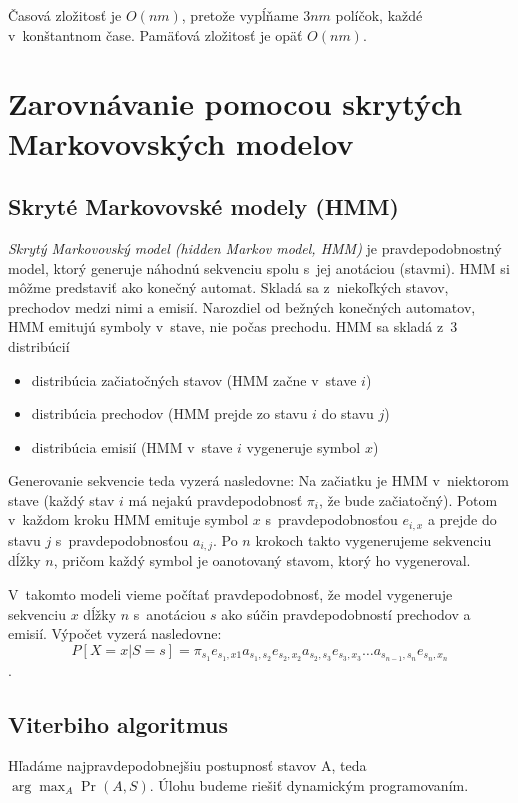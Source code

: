 Časová zložitosť je $O(nm)$, pretože vypĺňame $3nm$ políčok, každé v~konštantnom čase. Pamäťová zložitosť je opäť $O(nm)$.

\cite{durbin}

\section[Zarovnávanie s~HMM]{Zarovnávanie pomocou skrytých Markovovských modelov}
\label{sec:hmm-alignment}

\subsection{Skryté Markovovské modely (HMM)}
\textit{Skrytý Markovovský model (hidden Markov model, HMM)} je pravdepodobnostný model, ktorý generuje náhodnú sekvenciu spolu s~jej anotáciou (stavmi). HMM si môžme predstaviť ako konečný automat. Skladá sa z~niekoľkých stavov, prechodov medzi nimi a emisií. Narozdiel od bežných konečných automatov, HMM emitujú symboly v~stave, nie počas prechodu.
HMM sa skladá z~3 distribúcií
\begin{itemize}
\item distribúcia začiatočných stavov (HMM začne v~stave $i$)
\item distribúcia prechodov (HMM prejde zo stavu $i$ do stavu $j$)
\item distribúcia emisií (HMM v~stave $i$ vygeneruje symbol $x$)
\end{itemize}

Generovanie sekvencie teda vyzerá nasledovne: Na začiatku je HMM v~niektorom stave (každý stav $i$ má nejakú pravdepodobnosť $\pi_i$, že bude začiatočný). Potom v~každom kroku HMM emituje symbol $x$ s~pravdepodobnosťou $e_{i, x}$ a prejde do stavu $j$ s~pravdepodobnosťou $a_{i,j}$. Po $n$ krokoch takto vygenerujeme sekvenciu dĺžky $n$, pričom každý symbol je oanotovaný stavom, ktorý ho vygeneroval.

V~takomto modeli vieme počítať pravdepodobnosť, že model vygeneruje sekvenciu $x$ dĺžky $n$ s~anotáciou $s$ ako súčin pravdepodobností prechodov a emisií.
Výpočet vyzerá nasledovne: $$P[X=x | S=s] = \pi_{s_1} e_{s_1,x1} a_{s_1,s_2} e_{s_2,x_2} a_{s_2,s_3} e_{s_3,x_3}\dots a_{s_{n-1},s_n} e_{s_n,x_n}$$.
\cite{skripta, durbin}

\subsection{Viterbiho algoritmus}
Hľadáme najpravdepodobnejšiu postupnosť stavov A, teda $\arg\max_A \Pr(A, S)$. Úlohu budeme riešiť dynamickým programovaním.

